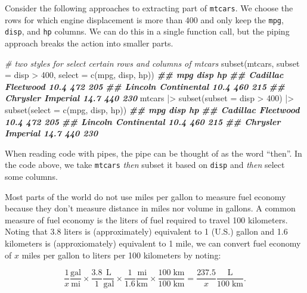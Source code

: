 \documentclass[
]{book}
\newenvironment{Shaded}{\begin{snugshade}}{\end{snugshade}}
\newcommand{\AttributeTok}[1]{\textcolor[rgb]{0.77,0.63,0.00}{#1}}
\newcommand{\CommentTok}[1]{\textcolor[rgb]{0.56,0.35,0.01}{\textit{#1}}}
\newcommand{\DecValTok}[1]{\textcolor[rgb]{0.00,0.00,0.81}{#1}}
\newcommand{\DocumentationTok}[1]{\textcolor[rgb]{0.56,0.35,0.01}{\textbf{\textit{#1}}}}
\newcommand{\FunctionTok}[1]{\textcolor[rgb]{0.00,0.00,0.00}{#1}}
\newcommand{\NormalTok}[1]{#1}
\newcommand{\SpecialCharTok}[1]{\textcolor[rgb]{0.00,0.00,0.00}{#1}}
\theoremstyle{definition}
\theoremstyle{definition}
\theoremstyle{definition}
\theoremstyle{definition}
\theoremstyle{remark}
\begin{document}
Consider the following approaches to extracting part of \texttt{mtcars}. We choose the rows for which engine displacement is more than 400 and only keep the \texttt{mpg}, \texttt{disp}, and \texttt{hp} columns. We can do this in a single function call, but the piping approach breaks the action into smaller parts.

\begin{Shaded}
\begin{Highlighting}[]
\CommentTok{\# two styles for select certain rows and columns of mtcars }
\FunctionTok{subset}\NormalTok{(mtcars,}
       \AttributeTok{subset =}\NormalTok{ disp }\SpecialCharTok{\textgreater{}} \DecValTok{400}\NormalTok{,}
       \AttributeTok{select =} \FunctionTok{c}\NormalTok{(mpg, disp, hp))}
\DocumentationTok{\#\#                      mpg disp  hp}
\DocumentationTok{\#\# Cadillac Fleetwood  10.4  472 205}
\DocumentationTok{\#\# Lincoln Continental 10.4  460 215}
\DocumentationTok{\#\# Chrysler Imperial   14.7  440 230}
\NormalTok{mtcars }\SpecialCharTok{|\textgreater{}}
  \FunctionTok{subset}\NormalTok{(}\AttributeTok{subset =}\NormalTok{ disp }\SpecialCharTok{\textgreater{}} \DecValTok{400}\NormalTok{) }\SpecialCharTok{|\textgreater{}}
  \FunctionTok{subset}\NormalTok{(}\AttributeTok{select =} \FunctionTok{c}\NormalTok{(mpg, disp, hp))}
\DocumentationTok{\#\#                      mpg disp  hp}
\DocumentationTok{\#\# Cadillac Fleetwood  10.4  472 205}
\DocumentationTok{\#\# Lincoln Continental 10.4  460 215}
\DocumentationTok{\#\# Chrysler Imperial   14.7  440 230}
\end{Highlighting}
\end{Shaded}

When reading code with pipes, the pipe can be thought of as the word ``then''. In the code above, we take \texttt{mtcars} \emph{then} subset it based on \texttt{disp} and \emph{then} select some columns.

Most parts of the world do not use miles per gallon to measure fuel economy because they don't measure distance in miles nor volume in gallons. A common measure of fuel economy is the liters of fuel required to travel 100 kilometers. Noting that 3.8 liters is (approximately) equivalent to 1 (U.S.) gallon and 1.6 kilometers is (approxiomately) equivalent to 1 mile, we can convert fuel economy of \(x\) miles per gallon to liters per 100 kilometers by noting:

\[\frac{1}{x}\frac{\mathrm{gal}}{\mathrm{mi}}\times\frac{3.8}{1}\frac{\mathrm{L}}{\mathrm{gal}}\times\frac{1}{1.6}\frac{\mathrm{mi}}{\mathrm{km}}\times\frac{100\;\mathrm{km}}{100\;\mathrm{km}} = \frac{237.5}{x}\frac{\mathrm{L}}{100\;\mathrm{km}}.\]
\end{document}
